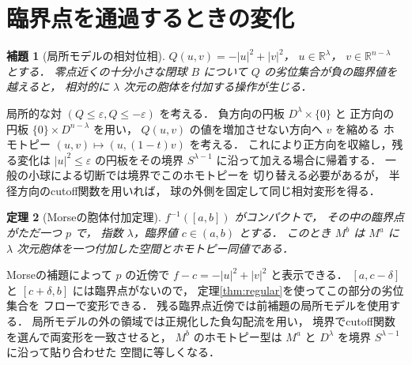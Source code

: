\documentclass[a5paper,10pt,onecolumn]{jsarticle}
\makeatletter
\theoremstyle{mathnotetheorem}
\newtheorem{theorem}{定理}[section]
\newtheorem{lemma}[theorem]{補題}
\renewcommand{\proofname}{証明}
\renewenvironment{proof}[1][\proofname]{%
  \par\pushQED{\qed}\normalfont\topsep4\p@\@plus2\p@\relax
  \trivlist\item[\hskip\labelsep\bfseries #1]\ignorespaces
}{\popQED\endtrivlist\@endpefalse}
\makeatother
\begin{document}
\section{臨界点を通過するときの変化}
\begin{lemma}[局所モデルの相対位相]
$Q(u,v)=-|u|^2+|v|^2$，
$u\in\mathbb R^\lambda$，
$v\in\mathbb R^{n-\lambda}$ とする．
零点近くの十分小さな閉球 $B$ について
$Q$ の劣位集合が負の臨界値を越えると，
相対的に $\lambda$ 次元の胞体を付加する操作が生じる．
\end{lemma}
\begin{proof}
局所的な対 $(Q\le\varepsilon,Q\le-\varepsilon)$ を考える．
負方向の円板
$D^\lambda\times\{0\}$ と
正方向の円板 $\{0\}\times D^{n-\lambda}$ を用い，
$Q(u,v)$ の値を増加させない方向へ $v$ を縮める
ホモトピー
$(u,v)\mapsto(u,(1-t)v)$ を考える．
これにより正方向を収縮し，残る変化は
$|u|^2\le\varepsilon$ の円板をその境界
$S^{\lambda-1}$ に沿って加える場合に帰着する．
一般の小球による切断では境界でこのホモトピーを
切り替える必要があるが，
半径方向のcutoff関数を用いれば，
球の外側を固定して同じ相対変形を得る．
\end{proof}
\begin{theorem}[Morseの胞体付加定理]\label{thm:cell}
$f^{-1}([a,b])$ がコンパクトで，
その中の臨界点がただ一つ $p$ で，
指数 $\lambda$，臨界値 $c\in(a,b)$ とする．
このとき $M^b$ は $M^a$ に
$\lambda$ 次元胞体を一つ付加した空間とホモトピー同値である．
\end{theorem}
\begin{proof}
Morseの補題によって $p$ の近傍で
$f-c=-|u|^2+|v|^2$ と表示できる．
$[a,c-\delta]$ と $[c+\delta,b]$ には臨界点がないので，
定理\ref{thm:regular}を使ってこの部分の劣位集合を
フローで変形できる．
残る臨界点近傍では前補題の局所モデルを使用する．
局所モデルの外の領域では正規化した負勾配流を用い，
境界でcutoff関数を選んで両変形を一致させると，
$M^b$ のホモトピー型は
$M^a$ と
$D^\lambda$ を境界 $S^{\lambda-1}$ に沿って貼り合わせた
空間に等しくなる．
\end{proof}
\end{document}
